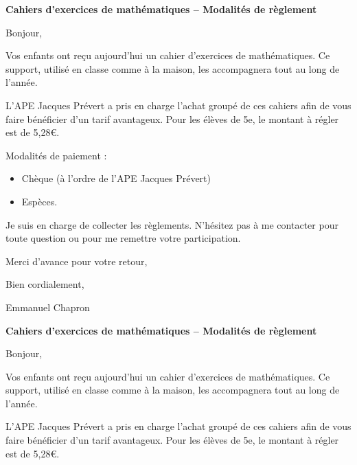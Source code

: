 \documentclass[a4paper]{book}
\begin{document}
\setcounter{chapter}{1}
\newcommand{\montant}{5,28}
\newcommand{\classe}{5e}

    \textbf{Cahiers d’exercices de mathématiques – Modalités de règlement}
    
    Bonjour,

    \medskip
    
    Vos enfants ont reçu aujourd’hui un cahier d’exercices de mathématiques. Ce support, utilisé en classe comme à la maison, les accompagnera tout au long de l’année.

    \medskip

    L’APE Jacques Prévert a pris en charge l’achat groupé de ces cahiers afin de vous faire bénéficier d’un tarif avantageux. Pour les élèves de \classe, le montant à régler est de \montant €.
    
    \medskip

    Modalités de paiement :
    \begin{itemize}
        \item Chèque (à l’ordre de l’APE Jacques Prévert)
        \item Espèces.
    \end{itemize}

    \medskip
    
    Je suis en charge de collecter les règlements. N’hésitez pas à me contacter pour toute question ou pour me remettre votre participation.
    
    Merci d’avance pour votre retour,
    
    Bien cordialement,
    
    Emmanuel Chapron


    \vspace{2cm}
    

    \textbf{Cahiers d’exercices de mathématiques – Modalités de règlement}
    
    Bonjour,

    \medskip
    
    Vos enfants ont reçu aujourd’hui un cahier d’exercices de mathématiques. Ce support, utilisé en classe comme à la maison, les accompagnera tout au long de l’année.

    \medskip

    L’APE Jacques Prévert a pris en charge l’achat groupé de ces cahiers afin de vous faire bénéficier d’un tarif avantageux. Pour les élèves de \classe, le montant à régler est de \montant €.
    
    \medskip
\end{document}
